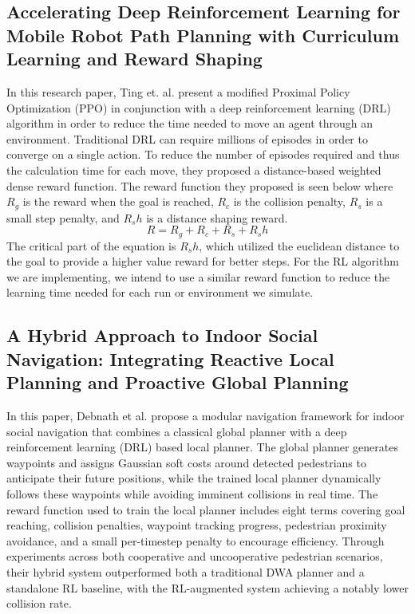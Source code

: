 \documentclass[conference]{IEEEtran}
\begin{document}
        \subsection{Accelerating Deep Reinforcement Learning for Mobile Robot Path Planning with Curriculum Learning and Reward Shaping\cite{b4}}
        In this research paper, Ting et. al. present a modified Proximal Policy Optimization (PPO) in conjunction with a deep reinforcement learning (DRL) algorithm in order to reduce the time needed  to move an agent through an environment. Traditional DRL can require millions of episodes in order to converge on a single action. To reduce the number of episodes required and thus the calculation time for each move, they proposed a distance-based weighted dense reward function. The reward function they proposed is seen below where $R_g$ is the reward when the goal is reached, $R_c$ is the collision penalty, $R_s$ is a small step penalty, and $R_sh$ is a distance shaping reward.
        \[R = R_g+R_c+R_s+R_sh\]
        The critical part of the equation is $R_sh$, which utilized the euclidean distance to the goal to provide a higher value reward for better steps. For the RL algorithm we are implementing, we intend to use a similar reward function to reduce the learning time needed for each run or environment we simulate. 

        \subsection{A Hybrid Approach to Indoor Social Navigation: Integrating Reactive Local Planning and Proactive Global Planning \cite{b9}}
        In this paper, Debnath et al. propose a modular navigation framework for  indoor social navigation that combines a classical global planner with a deep reinforcement learning (DRL) based local planner. The global planner generates waypoints and assigns Gaussian soft costs around detected pedestrians to anticipate their future positions, while the trained local planner dynamically follows these waypoints while avoiding imminent collisions in real time. The reward function used to train the local planner includes eight terms covering goal reaching, collision penalties, waypoint tracking progress, pedestrian proximity avoidance, and a small per-timestep penalty to encourage efficiency. Through experiments across both cooperative and uncooperative pedestrian scenarios, their hybrid system outperformed both a traditional DWA planner and a standalone RL baseline, with the RL-augmented system achieving a notably lower collision rate. 
\end{document}
